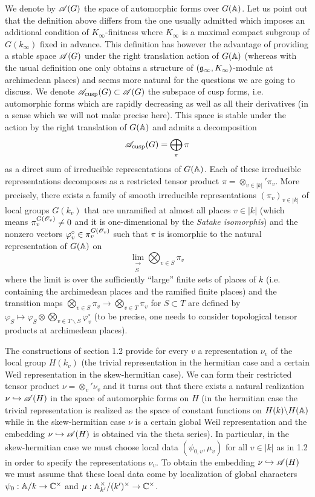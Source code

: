 We denote by $\mathscr{A}(G)$ the space of automorphic forms over $G(\mathbb{A})$.
Let us point out that the definition above differs from the one usually admitted which imposes an additional condition of $K_\infty$-finitness where $K_\infty$ is a maximal compact subgroup of $G(k_\infty)$ fixed in advance.
This definition has however the advantage of providing a stable space $\mathscr{A}(G)$ under the right translation action of $G(\mathbb{A})$ (whereas with the usual definition one only obtains a structure of $(\mathfrak{g}_\infty, K_\infty)$-module at archimedean places) and seems more natural for the questions we are going to discuss.
We denote $\mathscr{A}_{\mathrm{cusp}}(G) \subset \mathscr{A}(G)$ the subspace of cusp forms, i.e. automorphic forms which are rapidly decreasing as well as all their derivatives (in a sense which we will not make precise here).
This space is stable under the action by the right translation of $G(\mathbb{A})$ and admits a decomposition
\[
    \mathscr{A}_{\mathrm{cusp}}(G) = \bigoplus_\pi \pi
\]
as a direct sum of irreducible representations of $G(\mathbb{A})$.
Each of these irreducible representations decomposes as a restricted tensor product $\pi = \otimes_{v \in |k|}' \pi_v$.
More precisely, there exists a family of smooth irreducible representations $(\pi_v)_{v \in |k|}$ of local groups $G(k_v)$ that are unramified at almost all places $v \in |k|$ (which means $\pi_v^{G(\mathscr{O}_v)} \neq 0$ and it is one-dimensional by the \emph{Satake isomorphis}) and the nonzero vectors $\varphi_v^\circ \in \pi_v^{G(\mathscr{O}_v)}$ such that $\pi$ is isomorphic to the natural representation of $G(\mathbb{A})$ on
\[
    \lim_{\substack{\longrightarrow \\ S}} \bigotimes_{v \in S}\pi_v
\]
where the limit is over the sufficiently ``large'' finite sets of places of $k$ (i.e. containing the archimedean places and the ramified finite places) and the transition maps $\bigotimes_{v \in S} \pi_v \to \bigotimes_{v \in T} \pi_v$ for $S \subset T$ are defined by $\varphi_S \mapsto \varphi_S \otimes \bigotimes_{v \in T\backslash S} \varphi_v^\circ$ (to be precise, one needs to consider topological tensor products at archimedean places).

The constructions of section 1.2 provide for every $v$ a representation $\nu_v$ of the local group $H(k_v)$ (the trivial representation in the hermitian case and a certain Weil representation in the skew-hermitian case).
We can form their restricted tensor product $\nu = \otimes_v' \nu_v$ and it turns out that there exists a natural realization $\nu \hookrightarrow \mathscr{A}(H)$ in the space of automorphic forms on $H$ (in the hermitian case the trivial representation is realized
as the space of constant functions on $H(k) \backslash H(\mathbb{A})$ while in the skew-hermitian case $\nu$ is a certain global Weil representation and the embedding $\nu \hookrightarrow \mathscr{A}(H)$ is obtained via the
theta series).
In particular, in the skew-hermitian case we must choose local data $(\psi_{0, v}, \mu_v)$ for all $v \in |k|$ as in 1.2 in order to specify the representations $\nu_v$.
To obtain the embedding $\nu \hookrightarrow \mathscr{A}(H)$ we must assume  that these local data come by localization of global characters $\psi_0: \mathbb{A}/k \to \mathbb{C}^\times$ and $\mu: \mathbb{A}^\times_{k'} / (k')^\times \to \mathbb{C}^\times$.

